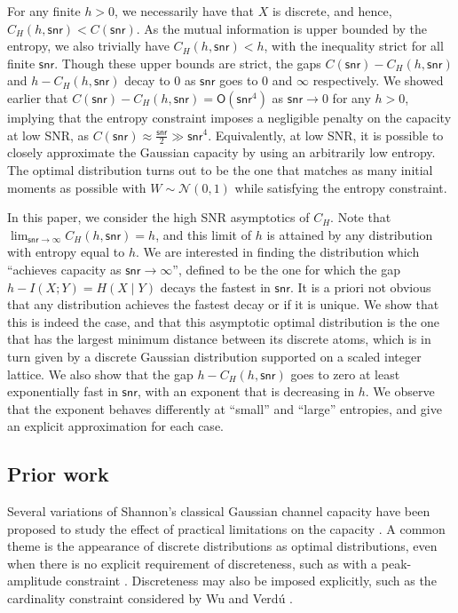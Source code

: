 \documentclass[11pt]{article}
\newcommand{\calN}{\mathcal{N}}
\renewcommand{\O}{\mathsf{O}}
\newcommand{\snr}{\mathsf{snr}}
\begin{document}
	For any finite $h > 0$, we necessarily have that $X$ is discrete, and hence, $C_H(h, \snr) < C(\snr)$.  As the mutual information is upper bounded by the entropy, we also trivially have $C_H(h, \snr) < h$, with the inequality strict for all finite $\snr$.  Though these upper bounds are strict, the gaps $C(\snr) - C_H(h, \snr)$ and $h - C_H(h, \snr)$ decay to 0 as $\snr$ goes to 0 and $\infty$ respectively.  We showed earlier \cite{girish2025lowsnr} that $C(\snr) - C_H(h, \snr) = \O(\snr^4)$ as $\snr \to 0$ for any $h > 0$, implying that the entropy constraint imposes a negligible penalty on the capacity at low SNR, as $C(\snr) \approx \frac{\snr}{2} \gg \snr^4$.  Equivalently, at low SNR, it is possible to closely approximate the Gaussian capacity by using an arbitrarily low entropy.  The optimal distribution turns out to be the one that matches as many initial 
	moments as possible with $W \sim \calN(0,1)$ while satisfying the entropy constraint.
	
	In this paper, we consider the high SNR asymptotics of $C_H$.  Note that $\lim_{\snr\to\infty} C_H(h, \snr) = h$, and this limit of $h$ is attained by any distribution with entropy equal to $h$.
	We are interested in finding the distribution which ``achieves capacity as $\snr \to \infty$'', defined to be the one for which the gap $h - I(X;Y) = H(X \mid Y)$ decays the fastest in $\snr$.  It is a priori not obvious that any distribution achieves the fastest decay or if it is unique.  We show that this is indeed the case, and that this asymptotic optimal distribution is the one that has the largest minimum distance between its discrete atoms, which is in turn given by a discrete Gaussian distribution \cite{canonne2020discrete,stephens2017gaussian} supported on a scaled integer lattice.
	We also show that the gap $h - C_H(h, \snr)$ goes to zero at least exponentially fast in $\snr$, with an exponent that is decreasing in $h$.  We observe that the exponent behaves differently at ``small'' and ``large'' entropies, and give an explicit approximation for each case.  
	
	\subsection{Prior work}
	Several variations of Shannon's classical Gaussian channel capacity \cite{shannon} have been proposed to study the effect of practical limitations on the capacity \cite{afaycal2001fading,lapidoth2009poisson,rf_2025,merhav2025volumebased}.  A common theme is the appearance of discrete distributions as optimal distributions, even when there is no explicit requirement of discreteness, such as with a peak-amplitude constraint \cite{smith1971information,sharma2010transition,dytso2019capacity,thangaraj2017capacity}.
	Discreteness may also be imposed explicitly, such as the cardinality constraint considered by
	Wu and Verd\'u \cite{wu2010impact}. 
	
\end{document}
